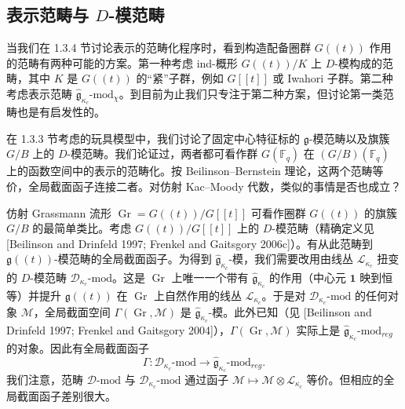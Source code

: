 
\subsection{表示范畴与 $D$-模范畴}

当我们在 1.3.4 节讨论表示的范畴化程序时，看到构造配备圈群 $G((t))$ 作用的范畴有两种可能的方案。第一种考虑 ind-概形 $G((t))/K$ 上 $D$-模构成的范畴，其中 $K$ 是 $G((t))$ 的“紧”子群，例如 $G[[t]]$ 或 Iwahori 子群。第二种考虑表示范畴 $\hat{\mathfrak{g}}_{\kappa_c}\text{-mod}_\chi$。到目前为止我们只专注于第二种方案，但讨论第一类范畴也是有启发性的。

在 1.3.3 节考虑的玩具模型中，我们讨论了固定中心特征标的 $\mathfrak{g}$-模范畴以及旗簇 $G/B$ 上的 $D$-模范畴。我们论证过，两者都可看作群 $G(\mathbb{F}_q)$ 在 $(G/B)(\mathbb{F}_q)$ 上的函数空间中的表示的范畴化。按 Beilinson--Bernstein 理论，这两个范畴等价，全局截面函子连接二者。对仿射 Kac--Moody 代数，类似的事情是否也成立？

仿射 Grassmann 流形 $\operatorname{Gr}=G((t))/G[[t]]$ 可看作圈群 $G((t))$ 的旗簇 $G/B$ 的最简单类比。考虑 $G((t))/G[[t]]$ 上的 $D$-模范畴（精确定义见 [Beilinson and Drinfeld 1997; Frenkel and Gaitsgory 2006c]）。有从此范畴到 $\mathfrak{g}((t))$-模范畴的全局截面函子。为得到 $\hat{\mathfrak{g}}_{\kappa_c}$-模，我们需要改用由线丛 $\mathcal{L}_{\kappa_c}$ 扭变的 $D$-模范畴 $\mathcal{D}_{\kappa_c}\text{-mod}$。这是 $\operatorname{Gr}$ 上唯一一个带有 $\hat{\mathfrak{g}}_{\kappa_c}$ 的作用（中心元 $\mathbf{1}$ 映到恒等）并提升 $\mathfrak{g}((t))$ 在 $\operatorname{Gr}$ 上自然作用的线丛 $\mathcal{L}_{\kappa_c}$。于是对 $\mathcal{D}_{\kappa_c}\text{-mod}$ 的任何对象 $\mathcal{M}$，全局截面空间 $\Gamma(\operatorname{Gr},\mathcal{M})$ 是 $\hat{\mathfrak{g}}_{\kappa_c}$-模。此外已知（见 [Beilinson and Drinfeld 1997; Frenkel and Gaitsgory 2004]），$\Gamma(\operatorname{Gr},\mathcal{M})$ 实际上是 $\hat{\mathfrak{g}}_{\kappa_c}\text{-mod}_{reg}$ 的对象。因此有全局截面函子
\[
    \Gamma:\mathcal{D}_{\kappa_c}\text{-mod}\to\hat{\mathfrak{g}}_{\kappa_c}\text{-mod}_{reg}.
\]
我们注意，范畴 $\mathcal{D}\text{-mod}$ 与 $\mathcal{D}_{\kappa_c}\text{-mod}$ 通过函子 $\mathcal{M}\mapsto\mathcal{M}\otimes\mathcal{L}_{\kappa_c}$ 等价。但相应的全局截面函子差别很大。

